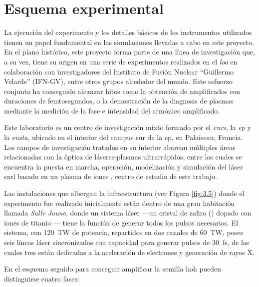 \newpage

\section{Esquema experimental}\label{sec:3.3}
La ejecución del experimento y los detalles básicos de los instrumentos utilizados tienen un papel fundamental en las simulaciones llevadas a cabo en este proyecto. En el plano histórico, este proyecto forma parte de una línea de investigación que, a su vez, tiene su origen en una serie de experimentos realizados en el \emph{\acrfull{loa}} en colaboración con investigadores del Instituto de Fusión Nuclear \enquote{Guillermo Velarde} (IFN-GV), entre otros grupos alrededor del mundo. Este esfuerzo conjunto ha conseguido alcanzar hitos como la obtención de  amplificados con duraciones de femtosegundos, o la demostración de la diagnosis de plasmas mediante la medición de la fase e intensidad del armónico amplificado\autocite{Depresseux2015,Tuitje2020}.

Este laboratorio es un centro de investigación mixto formado por el \emph{\acrfull{cnrs}}, la \emph{\acrfull{ep}} y la \emph{\acrfull{ensta}}, ubicado en el interior del campus sur de la \acrshort{ep}, en Palaiseau, Francia. Los campos de investigación tratados en su interior abarcan múltiples áreas relacionadas con la óptica de láseres-plasmas ultrarrápidos, entre los cuales se encuentra la puesta en marcha, operación, modelización y simulación del láser \acrshort{sxrl} basado en un plasma de iones , centro de estudio de este trabajo.

Las instalaciones que albergan la infraestructura (ver Figura \ref{fig:3.5}) donde el experimento fue realizado inicialmente están dentro de una gran habitación llamada \emph{Salle Jaune}, donde un sistema láser  ---un cristal de zafiro () dopado con iones de titanio --- tiene la función de generar todos los pulsos necesarios. El sistema, con \qty{120}{TW} de potencia, repartidos en dos canales de \qty{60}{TW}, posee seis líneas láser sincronizadas con capacidad para generar pulsos de \qty{30}{fs}, de las cuales tres están dedicadas a la aceleración de electrones y generación de rayos X.

En el esquema seguido para conseguir amplificar la semilla \acrshort{hoh} pueden distinguirse cuatro fases:

